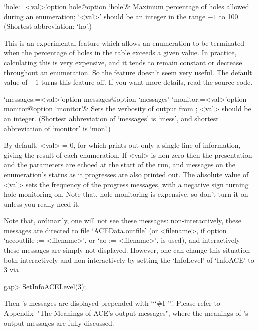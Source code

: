 \>`hole:=<val>'{option hole}@{option `hole'}&
Maximum percentage of holes allowed during an enumeration;
`<val>' should be an integer in the range $-1$ to 100.
(Shortest abbreviation: `ho'.)

This is an experimental feature which  allows  an  enumeration  to  be
terminated when the percentage of holes in the table exceeds  a  given
value. In practice, calculating this is very expensive, and  it  tends
to remain constant or  decrease  throughout  an  enumeration.  So  the
feature doesn't seem very useful. The default value of $-1$ turns this
feature off. If you want more details, read the source code.

\enditems


\beginitems

\>`messages:=<val>'{option messages}@{option `messages'}
\>`monitor:=<val>'{option monitor}@{option `monitor'}&
Sets the verbosity of output from {\ACE}; <val> should be an integer.
(Shortest  abbreviation  of  `messages'  is   `mess',   and   shortest
abbreviation of `monitor' is `mon'.)

By default, <val> = 0, for which {\ACE} prints out only a single  line
of information, giving the result of each  enumeration.  If  <val>  is
non-zero then the presentation and the parameters are  echoed  at  the
start of the run, and messages  on  the  enumeration's  status  as  it
progresses are also printed out. The absolute value of <val> sets  the
frequency of the progress messages, with a negative sign turning  hole
monitoring on. Note that, hole monitoring is expensive, so don't  turn
it on unless you really need it.

Note   that,  ordinarily,  one   will   not   see   these    messages:
non-interactively,   these   messages    are    directed    to    file
`ACEData.outfile'   (or   <filename>,   if   option   `aceoutfile   :=
<filename>', or `ao := <filename>', is used), and interactively  these
messages are simply  not  displayed.  However,  one  can  change  this
situation both interactively and   non-interactively  by  setting  the
`InfoLevel' of `InfoACE' to 3 via

\beginexample
gap> SetInfoACELevel(3);

\endexample

Then {\ACE}'s messages are  displayed  prepended  with  ```\#I  '''.
Please refer to Appendix~"The  Meanings  of  ACE's  output  messages",
where the meanings of {\ACE}'s output messages are fully discussed.


